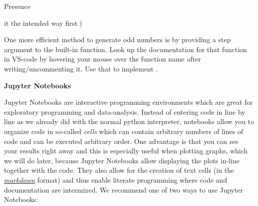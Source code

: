 \documentclass[a4paper, draft=False]{scrartcl}
\begin{document}
\begin{exam}[Presence]{Presence}
\begin{instructions}
\begin{problem*}
\begin{parts}
            it the intended way first.)
          \item One more efficient method to generate odd numbers is by providing a
            step argument to the built-in  function. Look up the
            documentation for that function in VS-code by hovering your mouse over
            the function name after writing/uncommenting it. Use that to implement
            .
          \end{parts}
        \end{problem*}

        \begin{problem*}\textbf{Jupyter Notebooks}

          Jupyter Notebooks are interactive programming environments which are great
          for exploratory programming and data-analysis. Instead of entering code in
          line by line as we already did with the normal python interpreter,
          notebooks allow you to organize code in so-called \emph{cells} which can
          contain arbitrary numbers of lines of code and can be executed arbitrary
          order. One advantage is that you can see your results right away and this
          is especially useful when plotting graphs, which we will do later, because
          Jupyter Notebooks allow displaying the plots in-line together with the
          code. They also allow for the creation of text cells (in the \href{%
            https://jupyter-notebook.readthedocs.io/en/latest/examples/Notebook/Working%
          }{\emph{markdown}} format) and thus enable literate programming where code
          and documentation are intermixed. We recommend one of two ways to use
          Jupyter Notebooks:


\end{problem*}
\end{instructions}
\end{exam}
\end{document}
